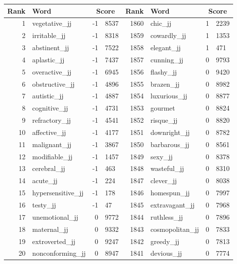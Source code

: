 \begin{table}[tbp]
    \begin{tabular}{| rlr@{.}l | rlr@{.}l |}
    \hline
    \textbf{Rank} & \textbf{Word} & \multicolumn{2}{c|}{\textbf{Score}} & \textbf{Rank} & \textbf{Word} & \multicolumn{2}{c|}{\textbf{Score}} \\
    \hline
    1 & vegetative\_jj & -1 & 8537    &    1860 & chic\_jj & 1 & 2239 \\
    2 & irritable\_jj & -1 & 8318    &    1859 & cowardly\_jj & 1 & 1353 \\
    3 & abstinent\_jj & -1 & 7522    &    1858 & elegant\_jj & 1 & 471 \\
    4 & aplastic\_jj & -1 & 7437    &    1857 & cunning\_jj & 0 & 9793 \\
    5 & overactive\_jj & -1 & 6945    &    1856 & flashy\_jj & 0 & 9420 \\
    6 & obstructive\_jj & -1 & 4896    &    1855 & brazen\_jj & 0 & 8982 \\
    7 & autistic\_jj & -1 & 4887    &    1854 & luxurious\_jj & 0 & 8877 \\
    8 & cognitive\_jj & -1 & 4731    &    1853 & gourmet & 0 & 8824 \\
    9 & refractory\_jj & -1 & 4541    &    1852 & risque\_jj & 0 & 8820 \\
    10 & affective\_jj & -1 & 4177    &    1851 & downright\_jj & 0 & 8782 \\
    11 & malignant\_jj & -1 & 3867    &    1850 & barbarous\_jj & 0 & 8561 \\
    12 & modifiable\_jj & -1 & 1457    &    1849 & sexy\_jj & 0 & 8378 \\
    13 & cerebral\_jj & -1 & 463    &    1848 & wasteful\_jj & 0 & 8310 \\
    14 & acute\_jj & -1 & 224    &    1847 & clever\_jj & 0 & 8038 \\
    15 & hypersensitive\_jj & -1 & 178    &    1846 & homespun\_jj & 0 & 7997 \\
    16 & testy\_jj & -1 & 47    &    1845 & extravagant\_jj & 0 & 7968 \\
    17 & unemotional\_jj & 0 & 9772    &    1844 & ruthless\_jj & 0 & 7896 \\
    18 & maternal\_jj & 0 & 9332    &    1843 & cosmopolitan\_jj & 0 & 7833 \\
    19 & extroverted\_jj & 0 & 9247    &    1842 & greedy\_jj & 0 & 7813 \\
    20 & nonconforming\_jj & 0 & 8947    &    1841 & devious\_jj & 0 & 7774 \\

\end{tabular}
\end{table}
